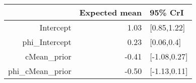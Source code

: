 \begin{tabular}{rrl}
  \hline
 & Expected mean & 95\% CrI \\ 
  \hline
Intercept & 1.03 & [0.85,1.22] \\ 
  phi\_Intercept & 0.23 & [0.06,0.4] \\ 
  cMean\_prior & -0.41 & [-1.08,0.27] \\ 
  phi\_cMean\_prior & -0.50 & [-1.13,0.11] \\ 
   \hline
\end{tabular}


